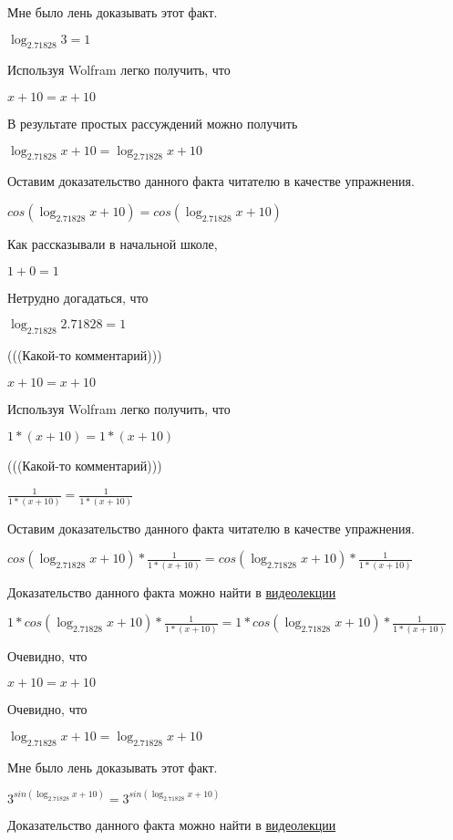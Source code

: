 \documentclass[12pt,a4paper,fleqn]{article}
\theoremstyle{definition}
\begin{document}
Мне было лень доказывать этот факт.

$\log_{ 2.71828 }{ 3 } =  1 $

Используя Wolfram легко получить, что

$ x  +  10  =  x  +  10 $

В результате простых рассуждений можно получить

$\log_{ 2.71828 }{ x  +  10 } = \log_{ 2.71828 }{ x  +  10 }$

Оставим доказательство данного факта читателю в качестве упражнения.

$cos(\log_{ 2.71828 }{ x  +  10 }) = cos(\log_{ 2.71828 }{ x  +  10 })$

Как рассказывали в начальной школе,

$ 1  +  0  =  1 $

Нетрудно догадаться, что

$\log_{ 2.71828 }{ 2.71828 } =  1 $

(((Какой-то комментарий)))

$ x  +  10  =  x  +  10 $

Используя Wolfram легко получить, что

$ 1  * ( x  +  10 ) =  1  * ( x  +  10 )$

(((Какой-то комментарий)))

$\frac{ 1 }{ 1  * ( x  +  10 )}
 = \frac{ 1 }{ 1  * ( x  +  10 )}
$

Оставим доказательство данного факта читателю в качестве упражнения.

$cos(\log_{ 2.71828 }{ x  +  10 }) * \frac{ 1 }{ 1  * ( x  +  10 )}
 = cos(\log_{ 2.71828 }{ x  +  10 }) * \frac{ 1 }{ 1  * ( x  +  10 )}
$

Доказательство данного факта можно найти в \href{https://www.youtube.com/watch?v=dQw4w9WgXcQ}{видеолекции}

$ 1  * cos(\log_{ 2.71828 }{ x  +  10 }) * \frac{ 1 }{ 1  * ( x  +  10 )}
 =  1  * cos(\log_{ 2.71828 }{ x  +  10 }) * \frac{ 1 }{ 1  * ( x  +  10 )}
$

Очевидно, что

$ x  +  10  =  x  +  10 $

Очевидно, что

$\log_{ 2.71828 }{ x  +  10 } = \log_{ 2.71828 }{ x  +  10 }$

Мне было лень доказывать этот факт.

${ 3 }^{sin(\log_{ 2.71828 }{ x  +  10 })} = { 3 }^{sin(\log_{ 2.71828 }{ x  +  10 })}$

Доказательство данного факта можно найти в \href{https://www.youtube.com/watch?v=dQw4w9WgXcQ}{видеолекции}
\end{document}

